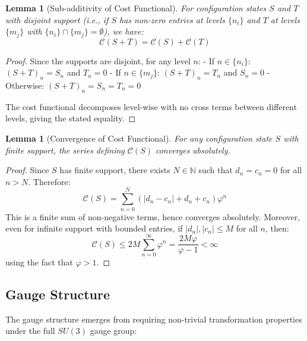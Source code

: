 \documentclass[11pt]{article}
\numberwithin{equation}{section}
\newtheorem{lemma}[theorem]{Lemma}
\theoremstyle{definition}
\theoremstyle{remark}
\begin{document}
\begin{lemma}[Sub-additivity of Cost Functional]
\label{lem:sub-additivity}
For configuration states $S$ and $T$ with disjoint support (i.e., if $S$ has non-zero entries at levels $\{n_i\}$ and $T$ at levels $\{m_j\}$ with $\{n_i\} \cap \{m_j\} = \emptyset$), we have:
\begin{equation}
\mathcal{C}(S + T) = \mathcal{C}(S) + \mathcal{C}(T)
\end{equation}
\end{lemma}

\begin{proof}
Since the supports are disjoint, for any level $n$:
- If $n \in \{n_i\}$: $(S+T)_n = S_n$ and $T_n = 0$
- If $n \in \{m_j\}$: $(S+T)_n = T_n$ and $S_n = 0$  
- Otherwise: $(S+T)_n = S_n = T_n = 0$

The cost functional decomposes level-wise with no cross terms between different levels, giving the stated equality.
\end{proof}

\begin{lemma}[Convergence of Cost Functional]
For any configuration state $S$ with finite support, the series defining $\mathcal{C}(S)$ converges absolutely.
\end{lemma}

\begin{proof}
Since $S$ has finite support, there exists $N \in \mathbb{N}$ such that $d_n = c_n = 0$ for all $n > N$. Therefore:
\begin{equation}
\mathcal{C}(S) = \sum_{n=0}^{N} \left(|d_n - c_n| + d_n + c_n\right) \varphi^n
\end{equation}
This is a finite sum of non-negative terms, hence converges absolutely. Moreover, even for infinite support with bounded entries, if $|d_n|, |c_n| \leq M$ for all $n$, then:
\begin{equation}
\mathcal{C}(S) \leq 2M \sum_{n=0}^{\infty} \varphi^n = \frac{2M\varphi}{\varphi - 1} < \infty
\end{equation}
using the fact that $\varphi > 1$.
\end{proof}

\subsection{Gauge Structure}

The gauge structure emerges from requiring non-trivial transformation properties under the full $SU(3)$ gauge group:
\end{document}

